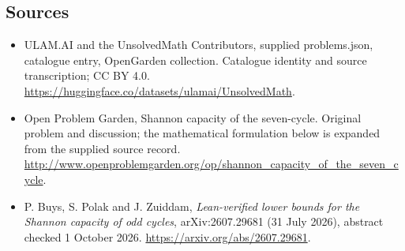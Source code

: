 \documentclass[11pt,a4paper]{article}
\begin{document}
\subsection{Sources}
\begin{itemize}
\item[S1] ULAM.AI and the UnsolvedMath Contributors, supplied problems.json, catalogue entry, OpenGarden collection. Catalogue identity and source transcription; CC BY 4.0.
\url{https://huggingface.co/datasets/ulamai/UnsolvedMath}.
\item[S2] Open Problem Garden, Shannon capacity of the seven-cycle. Original problem and discussion; the mathematical formulation below is expanded from the supplied source record.
\url{http://www.openproblemgarden.org/op/shannon_capacity_of_the_seven_cycle}.
\item[R1] P. Buys, S. Polak and J. Zuiddam, \emph{Lean-verified lower bounds for the Shannon capacity of odd cycles}, arXiv:2607.29681 (31 July 2026), abstract checked 1 October 2026.
\url{https://arxiv.org/abs/2607.29681}.
\end{itemize}
\end{document}
